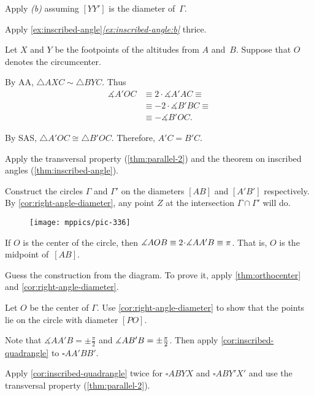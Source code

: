  Apply \textit{(b)} assuming $[YY']$ is the diameter of~$\Gamma$. 

 Apply \ref{ex:inscribed-angle}\textit{\ref{ex:inscribed-angle:b}}
thrice.

Let $X$ and $Y$ be the footpoints of the altitudes from $A$ and~$B$.
Suppose that $O$ denotes the circumcenter.
 
By AA, $\triangle A X C\sim \triangle B Y C$.
Thus 
\begin{align*}
\measuredangle A'OC
&\equiv 
2\cdot \measuredangle A' A C
\equiv
\\
&\equiv-2\cdot\measuredangle B' B C
\equiv
\\
&\equiv-\measuredangle B'OC.
\end{align*}

By SAS, $\triangle A'OC\cong\triangle B'OC$.
Therefore, $A'C=B'C$.

 Apply the transversal property (\ref{thm:parallel-2}) and the theorem on inscribed angles (\ref{thm:inscribed-angle}).

Construct the circles $\Gamma$ and $\Gamma'$
on the diameters $[AB]$ and $[A'B']$ respectively.
By \ref{cor:right-angle-diameter},
any point $Z$ at the intersection $\Gamma\cap \Gamma'$ will do.


\begin{wrapfigure}[8]{r}{20mm}
\vskip-4mm
\centering
\texttt{[image: mppics/pic-336]}
\end{wrapfigure}

If $O$ is the center of the circle, then 
$\measuredangle AOB\z\equiv 2\cdot \measuredangle AA'B\equiv\pi$.
That is, $O$ is the midpoint of~$[AB]$.

Guess the construction from the diagram.
To prove it,
apply \ref{thm:orthocenter} and \ref{cor:right-angle-diameter}.

Let $O$ be the center of $\Gamma$.
Use \ref{cor:right-angle-diameter} to show that the points lie on the circle with diameter $[PO]$.

Note that $\measuredangle AA'B=\pm\tfrac\pi2$ and $\measuredangle AB'B=\pm\tfrac\pi2$.
Then apply \ref{cor:inscribed-quadrangle}
to $\square AA'BB'$.

Apply \ref{cor:inscribed-quadrangle} twice for $\square ABYX$ and $\square ABY'X'$ and use the transversal property (\ref{thm:parallel-2}).

